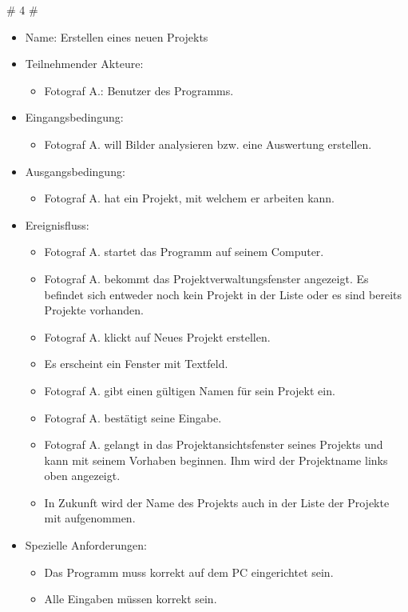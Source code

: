 		\# 4 \#
		\begin{itemize}
			\item Name: Erstellen eines neuen Projekts
			\item Teilnehmender Akteure:
			\begin{itemize}
				\item	Fotograf A.: Benutzer des Programms.
			\end{itemize}
			\item Eingangsbedingung:
			\begin{itemize}
				\item Fotograf A. will Bilder analysieren bzw. eine Auswertung erstellen.						
			\end{itemize}
			\item Ausgangsbedingung:
			\begin{itemize}
				\item	Fotograf A. hat ein Projekt, mit welchem er arbeiten kann.		
			\end{itemize}
			\item Ereignisfluss:
			\begin{itemize}
				\item Fotograf A. startet das Programm auf seinem Computer.
				\item Fotograf A. bekommt das Projektverwaltungsfenster angezeigt. Es befindet sich entweder noch kein Projekt in der Liste oder es sind bereits Projekte vorhanden.
				\item Fotograf A. klickt auf Neues Projekt erstellen.
				\item Es erscheint ein Fenster mit Textfeld.
				\item Fotograf A. gibt einen gültigen Namen für sein Projekt ein.
				\item Fotograf A. bestätigt seine Eingabe.
				\item Fotograf A. gelangt in das Projektansichtsfenster seines Projekts und kann mit seinem Vorhaben beginnen. Ihm wird der Projektname links oben angezeigt.
				\item In Zukunft wird der Name des Projekts auch in der Liste der Projekte mit aufgenommen.
			\end{itemize}
			\item Spezielle Anforderungen:
			\begin{itemize}
				\item	Das Programm muss korrekt auf dem PC eingerichtet sein.
				\item Alle Eingaben müssen korrekt sein.
			\end{itemize}			
		\end{itemize}
		
